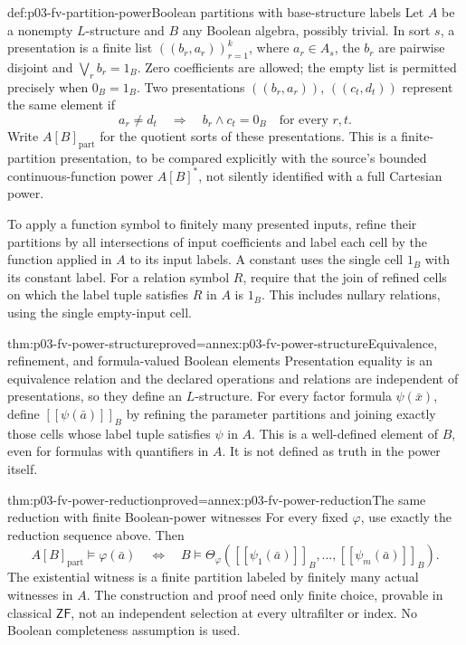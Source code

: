 \begin{hbdefinition}{def:p03-fv-partition-power}{Boolean partitions with base-structure labels}
Let \(A\) be a nonempty \(L\)-structure and \(B\) any Boolean algebra,
possibly trivial. In sort \(s\), a presentation is a finite list
\(((b_r,a_r))_{r=1}^k\), where \(a_r\in A_s\), the \(b_r\) are
pairwise disjoint and \(\bigvee_r b_r=1_B\). Zero coefficients are
allowed; the empty list is permitted precisely when \(0_B=1_B\).
Two presentations \(((b_r,a_r))\), \(((c_t,d_t))\) represent the same
element if
\[
                  a_r\ne d_t\quad\Longrightarrow\quad b_r\wedge c_t=0_B
                    \quad\text{for every }r,t.
\]
Write \(A[B]_{\mathrm{part}}\) for the quotient sorts of these presentations.
This is a finite-partition presentation, to be compared explicitly with the
source's bounded continuous-function power \(A[B]^*\), not silently
identified with a full Cartesian power.

To apply a function symbol to finitely many presented inputs, refine their
partitions by all intersections of input coefficients and label each cell
by the function applied in \(A\) to its input labels. A constant uses the
single cell \(1_B\) with its constant label. For a relation symbol \(R\),
require that the join of refined cells on which the label tuple satisfies
\(R\) in \(A\) is \(1_B\). This includes nullary relations, using the
single empty-input cell.
\end{hbdefinition}

\begin{hbtheorem}{thm:p03-fv-power-structure}{proved=annex:p03-fv-power-structure}{Equivalence, refinement, and formula-valued Boolean elements}
Presentation equality is an equivalence relation and the declared operations
and relations are independent of presentations, so they define an
\(L\)-structure. For every factor formula \(\psi(\bar x)\), define
\([\![\psi(\bar a)]\!]_B\) by refining the parameter partitions and
joining exactly those cells whose label tuple satisfies \(\psi\) in \(A\).
This is a well-defined element of \(B\), even for formulas with quantifiers
in \(A\). It is not defined as truth in the power itself.
\end{hbtheorem}

\begin{hbtheorem}{thm:p03-fv-power-reduction}{proved=annex:p03-fv-power-reduction}{The same reduction with finite Boolean-power witnesses}
For every fixed \(\varphi\), use exactly the reduction sequence above.
Then
\[
 A[B]_{\mathrm{part}}\models\varphi(\bar a)
 \quad\Longleftrightarrow\quad
 B\models\Theta_\varphi
    ([\![\psi_1(\bar a)]\!]_B,\ldots,[\![\psi_m(\bar a)]\!]_B).
\]
The existential witness is a finite partition labeled by finitely many
actual witnesses in \(A\). The construction and proof need only finite
choice, provable in classical \(\mathsf{ZF}\), not an independent selection
at every ultrafilter or index. No Boolean completeness assumption is used.
\end{hbtheorem}

